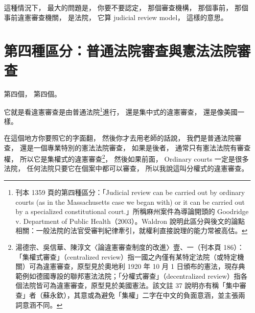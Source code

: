 \hypertarget{w06:cue:1151}{}這種情況下，
\hypertarget{w06:cue:1152}{}最大的問題是，
\hypertarget{w06:cue:1153}{}你要不要認定，
\hypertarget{w06:cue:1154}{}那個審查機構，
\hypertarget{w06:cue:1155}{}那個事前，
\hypertarget{w06:cue:1156}{}那個事前違憲審查機關，
\hypertarget{w06:cue:1157}{}是法院，
\hypertarget{w06:cue:1158}{}它算 judicial review model，
\hypertarget{w06:cue:1159}{}這樣的意思。

\section{第四種區分：普通法院審查與憲法法院審查}

\hypertarget{w06:cue:1160}{}第四個，
\hypertarget{w06:cue:1161}{}第四個。

\hypertarget{w06:cue:1162}{}它就是看違憲審查是由普通法院\footnote{刊本 1359 頁的第四種區分：「Judicial review can be carried out by ordinary courts (as in the Massachusetts case we began with) or it can be carried out by a specialized constitutional court.」所稱麻州案件為導論開頭的 Goodridge v. Department of Public Health（2003）。Waldron 說明此區分與後文的論點相關：一般法院的法官受審判紀律牽引，就權利直接說理的能力常被高估。}進行，
\hypertarget{w06:cue:1163}{}還是集中式的違憲審查，
\hypertarget{w06:cue:1164}{}還是像美國一樣。

\hypertarget{w06:cue:1165}{}在這個地方你要照它的字面翻，
\hypertarget{w06:cue:1166}{}然後你才去用老師的話說，
\hypertarget{w06:cue:1167}{}我們是普通法院審查，
\hypertarget{w06:cue:1168}{}還是一個專業特別的憲法法院審查，
\hypertarget{w06:cue:1169}{}如果是後者，
\hypertarget{w06:cue:1170}{}通常只有憲法法院有審查權，
\hypertarget{w06:cue:1171}{}所以它是集權式的違憲審查\footnote{湯德宗、吳信華、陳淳文〈論違憲審查制度的改進〉壹、一（刊本頁 186）：「集權式審查」（centralized review）指一國之內僅有某特定法院（或特定機關）可為違憲審查，原型見於奧地利 1920 年 10 月 1 日頒布的憲法，現存典範例如德國專設的聯邦憲法法院；「分權式審查」（decentralized review）指各個法院皆可為違憲審查，原型見於美國憲法。該文註 37 說明亦有稱「集中審查」者（蘇永欽），其意或為避免「集權」二字在中文的負面意涵，並主張兩詞意涵不同。}，
\hypertarget{w06:cue:1172}{}然後如果前面，
\hypertarget{w06:cue:1173}{}Ordinary courts 一定是很多法院，
\hypertarget{w06:cue:1174}{}任何法院只要它在個案中都可以審查，
\hypertarget{w06:cue:1175}{}所以我說這叫分權式的違憲審查。

